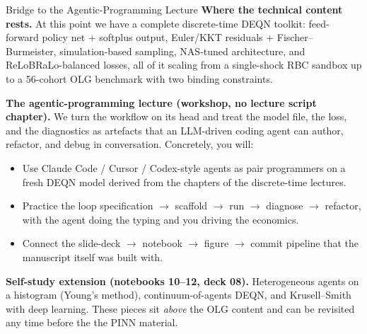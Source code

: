 \documentclass[aspectratio=169,11pt]{beamer}
\newcommand{\emphc}[1]{\textcolor{harvardcrimson}{#1}}
\begin{document}
\begin{frame}{Bridge to the Agentic-Programming Lecture}
\footnotesize
\textbf{Where the technical content rests.}  At this point we have a complete discrete-time DEQN toolkit: feed-forward policy net + softplus output, Euler/KKT residuals + Fischer--Burmeister, simulation-based sampling, NAS-tuned architecture, and ReLoBRaLo-balanced losses, all of it scaling from a single-shock RBC sandbox up to a 56-cohort OLG benchmark with two binding constraints.

\vspace{0.4em}
\textbf{The agentic-programming lecture (workshop, no lecture script chapter).}  We turn the workflow on its head and treat the model file, the loss, and the diagnostics as artefacts that an LLM-driven coding agent can author, refactor, and debug in conversation.  Concretely, you will:
\begin{itemize}\itemsep1pt
    \item Use Claude Code / Cursor / Codex-style agents as pair programmers on a fresh DEQN model derived from the chapters of the discrete-time lectures.
    \item Practice the loop \emphc{specification $\to$ scaffold $\to$ run $\to$ diagnose $\to$ refactor}, with the agent doing the typing and you driving the economics.
    \item Connect the slide-deck $\to$ notebook $\to$ figure $\to$ commit pipeline that the manuscript itself was built with.
\end{itemize}

\vspace{0.4em}
\textbf{Self-study extension (notebooks 10--12, deck 08).}  Heterogeneous agents on a histogram (Young's method), continuum-of-agents DEQN, and Krusell--Smith with deep learning.  These pieces sit \emph{above} the OLG content and can be revisited any time before the the PINN material.
\end{frame}
\end{document}
